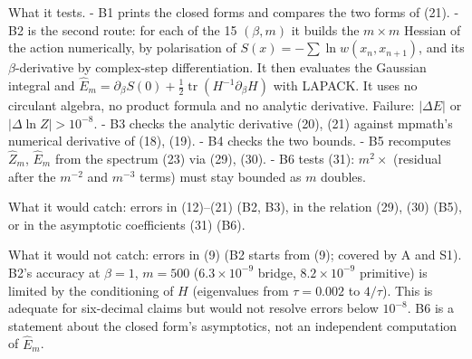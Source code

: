 \documentclass[11pt,a4paper]{article}
\begin{document}
What it tests. - B1 prints the closed forms and compares the two forms
of (21). - B2 is the second route: for each of the 15 \((\beta,m)\) it
builds the \(m\times m\) Hessian of the action numerically, by
polarisation of \(S(x) = -\sum\ln w(x_n,x_{n+1})\), and its
\(\beta\)-derivative by complex-step differentiation. It then evaluates
the Gaussian integral and
\(\hat E_m = \partial_\beta S(0) + \tfrac12\operatorname{tr}(H^{-1}\partial_\beta H)\)
with LAPACK. It uses no circulant algebra, no product formula and no
analytic derivative. Failure: \(|\Delta E|\) or
\(|\Delta\ln Z|>10^{-8}\). - B3 checks the analytic derivative (20),
(21) against mpmath's numerical derivative of (18), (19). - B4 checks
the two bounds. - B5 recomputes \(\hat Z_m\), \(\hat E_m\) from the
spectrum (23) via (29), (30). - B6 tests (31): \(m^2\times\) (residual
after the \(m^{-2}\) and \(m^{-3}\) terms) must stay bounded as \(m\)
doubles.

What it would catch: errors in (12)--(21) (B2, B3), in the relation
(29), (30) (B5), or in the asymptotic coefficients (31) (B6).

What it would not catch: errors in (9) (B2 starts from (9); covered by A
and S1). B2's accuracy at \(\beta=1\), \(m=500\) (\(6.3\times10^{-9}\)
bridge, \(8.2\times10^{-9}\) primitive) is limited by the conditioning
of \(H\) (eigenvalues from \(\tau=0.002\) to \(4/\tau\)). This is
adequate for six-decimal claims but would not resolve errors below
\(10^{-8}\). B6 is a statement about the closed form's asymptotics, not
an independent computation of \(\hat E_m\).
\end{document}
